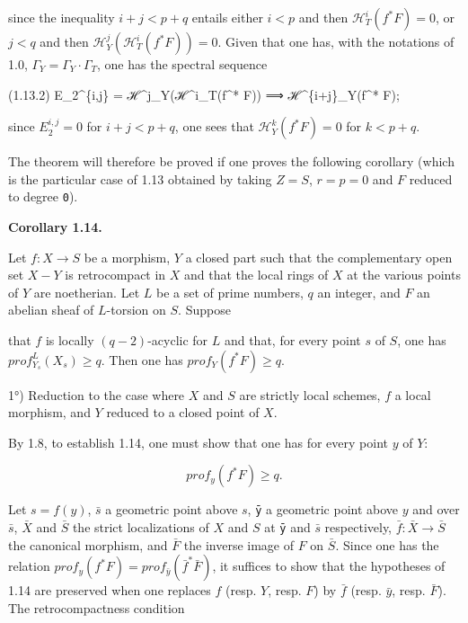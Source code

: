 \documentclass[
]{article}
\newenvironment{Shaded}{}{}
\newcommand{\NormalTok}[1]{#1}
\begin{document}
since the inequality \(i + j < p + q\) entails either \(i < p\) and then
\(\mathcal{H}^{i}_{T}(f^{*} F) = 0\), or \(j < q\) and then
\(\mathcal{H}^{j}_{Y}(\mathcal{H}^{i}_{T}(f^{*} F)) = 0\). Given that
one has, with the notations of 1.0,
\(\Gamma_{Y} = \Gamma_{Y} \cdot \Gamma_{T}\), one has the spectral
sequence

\begin{Shaded}
\begin{Highlighting}[]
\NormalTok{(1.13.2)    E\_2\^{}\{i,j\} = ℋ\^{}j\_Y(ℋ\^{}i\_T(f\^{}* F)) ⟹ ℋ\^{}\{i+j\}\_Y(f\^{}* F);}
\end{Highlighting}
\end{Shaded}

since \(E^{i,j}_{2} = 0\) for \(i + j < p + q\), one sees that
\(\mathcal{H}^{k}_{Y}(f^{*} F) = 0\) for \(k < p + q\).

The theorem will therefore be proved if one proves the following
corollary (which is the particular case of 1.13 obtained by taking
\(Z = S\), \(r = p = 0\) and \(F\) reduced to degree \texttt{0}).

\textbf{Corollary 1.14.}

Let \(f : X \to S\) be a morphism, \(Y\) a closed part such that the
complementary open set \(X - Y\) is retrocompact in \(X\) and that the
local rings of \(X\) at the various points of \(Y\) are noetherian. Let
\(L\) be a set of prime numbers, \(q\) an integer, and \(F\) an abelian
sheaf of \(L\)-torsion on \(S\). Suppose

that \(f\) is locally \((q - 2)\)-acyclic for \(L\) and that, for every
point \(s\) of \(S\), one has \(prof^{L}_{Y_{s}}(X_{s}) \geqslant q\).
Then one has \(prof_{Y}(f^{*} F) \geqslant q\).

1°) Reduction to the case where \(X\) and \(S\) are strictly local
schemes, \(f\) a local morphism, and \(Y\) reduced to a closed point of
\(X\).

By 1.8, to establish 1.14, one must show that one has for every point
\(y\) of \(Y\):

\[
prof_{y}(f^{*} F) \geqslant q.
\]

Let \(s = f(y)\), \(\bar{s}\) a geometric point above \(s\), \texttt{ȳ}
a geometric point above \(y\) and over \(\bar{s}\), \(\bar{X}\) and
\(\bar{S}\) the strict localizations of \(X\) and \(S\) at \texttt{ȳ}
and \(\bar{s}\) respectively, \(\bar{f} : \bar{X} \to \bar{S}\) the
canonical morphism, and \(\bar{F}\) the inverse image of \(F\) on
\(\bar{S}\). Since one has the relation
\(prof_{y}(f^{*} F) = prof_{\bar{y}}(\bar{f}^{*} \bar{F})\), it suffices
to show that the hypotheses of 1.14 are preserved when one replaces
\(f\) (resp. \(Y\), resp. \(F\)) by \(\bar{f}\) (resp. \({\bar{y}}\),
resp. \(\bar{F}\)). The retrocompactness condition
\end{document}
